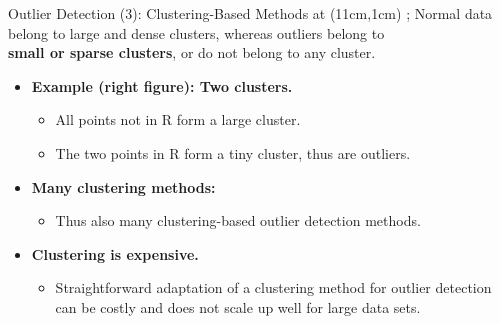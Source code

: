 \begin{frame}{Outlier Detection (3): Clustering-Based Methods}
	\tikzoverlay at (11cm,1cm) {};
	Normal data belong to large and dense clusters, whereas outliers belong to\\ \textbf{\color{airforceblue}small or sparse clusters}, or do not belong to any cluster.
	\begin{itemize}

		\item \textbf{Example (right figure): Two clusters.}
		      \begin{itemize}
			      \item All points not in R form a large cluster.
			      \item The two points in R form a tiny cluster, thus are outliers.

		      \end{itemize}
		\item \textbf{Many clustering methods:}
		      \begin{itemize}
			      \item Thus also many clustering-based outlier detection methods.
		      \end{itemize}
		\item \textbf{Clustering is expensive.}
		      \begin{itemize}
			      \item Straightforward adaptation of a clustering method for outlier detection can be costly and does not scale up well for large data sets.
		      \end{itemize}
	\end{itemize}
\end{frame}
